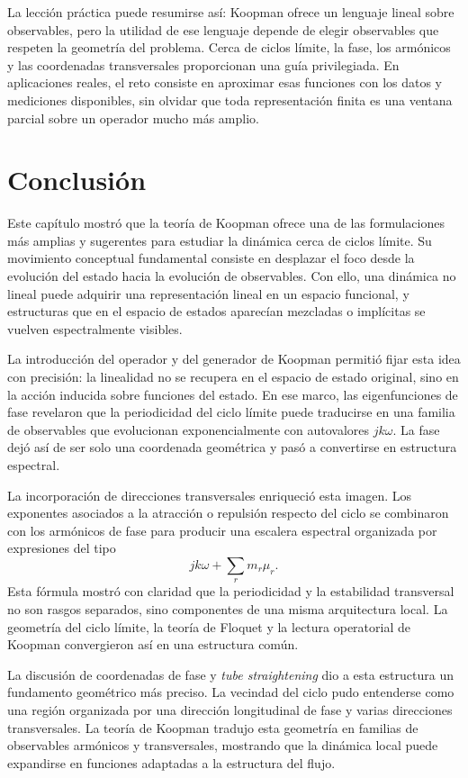 La lección práctica puede resumirse así: Koopman ofrece un lenguaje lineal sobre observables, pero la utilidad de ese lenguaje depende de elegir observables que respeten la geometría del problema. Cerca de ciclos límite, la fase, los armónicos y las coordenadas transversales proporcionan una guía privilegiada. En aplicaciones reales, el reto consiste en aproximar esas funciones con los datos y mediciones disponibles, sin olvidar que toda representación finita es una ventana parcial sobre un operador mucho más amplio.


\section*{Conclusión}

Este capítulo mostró que la teoría de Koopman ofrece una de las formulaciones más amplias y sugerentes para estudiar la dinámica cerca de ciclos límite. Su movimiento conceptual fundamental consiste en desplazar el foco desde la evolución del estado hacia la evolución de observables. Con ello, una dinámica no lineal puede adquirir una representación lineal en un espacio funcional, y estructuras que en el espacio de estados aparecían mezcladas o implícitas se vuelven espectralmente visibles.

La introducción del operador y del generador de Koopman permitió fijar esta idea con precisión: la linealidad no se recupera en el espacio de estado original, sino en la acción inducida sobre funciones del estado. En ese marco, las eigenfunciones de fase revelaron que la periodicidad del ciclo límite puede traducirse en una familia de observables que evolucionan exponencialmente con autovalores \(jk\omega\). La fase dejó así de ser solo una coordenada geométrica y pasó a convertirse en estructura espectral.

La incorporación de direcciones transversales enriqueció esta imagen. Los exponentes asociados a la atracción o repulsión respecto del ciclo se combinaron con los armónicos de fase para producir una escalera espectral organizada por expresiones del tipo
\[
jk\omega+\sum_r m_r\mu_r.
\]
Esta fórmula mostró con claridad que la periodicidad y la estabilidad transversal no son rasgos separados, sino componentes de una misma arquitectura local. La geometría del ciclo límite, la teoría de Floquet y la lectura operatorial de Koopman convergieron así en una estructura común.

La discusión de coordenadas de fase y \emph{tube straightening} dio a esta estructura un fundamento geométrico más preciso. La vecindad del ciclo pudo entenderse como una región organizada por una dirección longitudinal de fase y varias direcciones transversales. La teoría de Koopman tradujo esta geometría en familias de observables armónicos y transversales, mostrando que la dinámica local puede expandirse en funciones adaptadas a la estructura del flujo.

